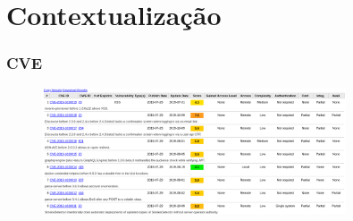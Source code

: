 \documentclass{beamer}
\begin{document}
\section{Contextualização}
\begin{frame}
	\frametitle{CVE}
	\begin{figure}[htp]
		\includegraphics[width=9cm]{cve.png}
	\end{figure}
\end{frame}
\end{document}
